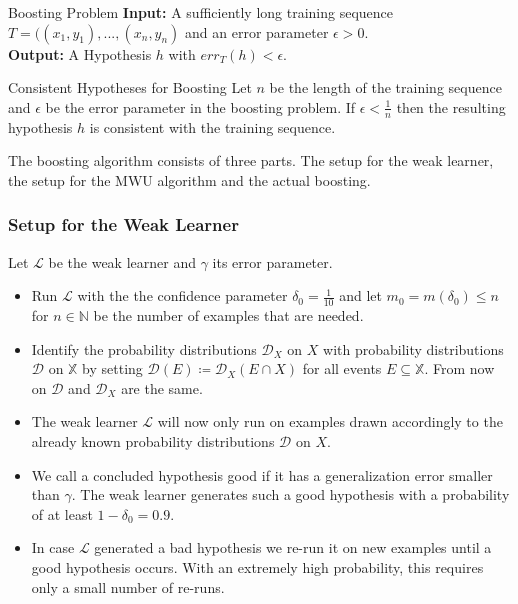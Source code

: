 \documentclass[english]{panikzettel}
\begin{document}
\begin{halfboxl}
\vspace{-\baselineskip}
\begin{defi}{Boosting Problem}
\textbf{Input:} A sufficiently long training sequence $T=((x_1,y_1),...,(x_n,y_n)$ and an error parameter $\epsilon>0$.\\
\textbf{Output:} A Hypothesis $h$ with $err_T(h)<\epsilon$.
\end{defi}
\end{halfboxl}
\begin{halfboxr}
\vspace{-\baselineskip}
\begin{theo}{Consistent Hypotheses for Boosting}
Let $n$ be the length of the training sequence and $\epsilon$ be the error parameter in the boosting problem. If $\epsilon<\frac{1}{n}$ then the resulting hypothesis $h$ is consistent with the training sequence.
\end{theo}
\end{halfboxr}

The boosting algorithm consists of three parts. The setup for the weak learner, the setup for the MWU algorithm and the actual boosting.

\subsubsection{Setup for the Weak Learner}
Let $\mathcal{L}$ be the weak learner and $\gamma$ its error parameter.
\begin{itemize}
\item Run $\mathcal{L}$ with the the confidence parameter $\delta_0=\frac{1}{10}$ and let $m_0=m(\delta_0)\leq n$ for $n\in\mathbb{N}$ be the number of examples that are needed.
\item Identify the probability distributions $\mathcal{D}_X$ on $X$ with probability distributions $\mathcal{D}$ on $\mathbb{X}$ by setting $\mathcal{D}(E)\coloneqq \mathcal{D}_X(E\cap X)$ for all events $E\subseteq \mathbb{X}$. From now on $\mathcal{D}$ and $\mathcal{D}_X$ are the same.
\item The weak learner $\mathcal{L}$ will now only run on examples drawn accordingly to the already known probability distributions $\mathcal{D}$ on $X$.
\item We call a concluded hypothesis good if it has a generalization error smaller than $\gamma$. The weak learner generates such a good hypothesis with a probability of at least $1-\delta_0=0.9$.
\item In case $\mathcal{L}$ generated a bad hypothesis we re-run it on new examples until a good hypothesis occurs. With an extremely high probability, this requires only a small number of re-runs. 
\end{itemize}
\end{document}
